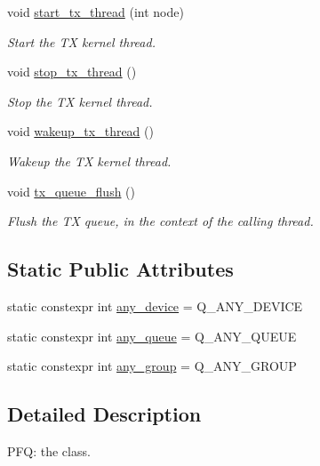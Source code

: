 \begin{DoxyCompactItemize}
void \hyperlink{classnet_1_1pfq_a90c4ea400b987ae1f75fb1c1574fefa5}{start\-\_\-tx\-\_\-thread} (int node)
\begin{DoxyCompactList}\small\item\em Start the T\-X kernel thread. \end{DoxyCompactList}\item 
void \hyperlink{classnet_1_1pfq_ab45272fa6c3b0ccaaf9b7c6049493e7f}{stop\-\_\-tx\-\_\-thread} ()
\begin{DoxyCompactList}\small\item\em Stop the T\-X kernel thread. \end{DoxyCompactList}\item 
void \hyperlink{classnet_1_1pfq_a0f7e48a2b3a175351bc648704de4574c}{wakeup\-\_\-tx\-\_\-thread} ()
\begin{DoxyCompactList}\small\item\em Wakeup the T\-X kernel thread. \end{DoxyCompactList}\item 
void \hyperlink{classnet_1_1pfq_ac62937a932e1af8669f72ee165366397}{tx\-\_\-queue\-\_\-flush} ()
\begin{DoxyCompactList}\small\item\em Flush the T\-X queue, in the context of the calling thread. \end{DoxyCompactList}\end{DoxyCompactItemize}
\subsection*{Static Public Attributes}
\begin{DoxyCompactItemize}
\item 
static constexpr int \hyperlink{classnet_1_1pfq_a8ecbb4cb4e632b85865a6c77fd4a6a45}{any\-\_\-device} = Q\-\_\-\-A\-N\-Y\-\_\-\-D\-E\-V\-I\-C\-E
\item 
static constexpr int \hyperlink{classnet_1_1pfq_a0d4eca6d0925b7c49365675c9cf9385c}{any\-\_\-queue} = Q\-\_\-\-A\-N\-Y\-\_\-\-Q\-U\-E\-U\-E
\item 
static constexpr int \hyperlink{classnet_1_1pfq_a3aa94e5b77640a4db592893fa9220e81}{any\-\_\-group} = Q\-\_\-\-A\-N\-Y\-\_\-\-G\-R\-O\-U\-P
\end{DoxyCompactItemize}


\subsection{Detailed Description}
P\-F\-Q\-: the class. 

